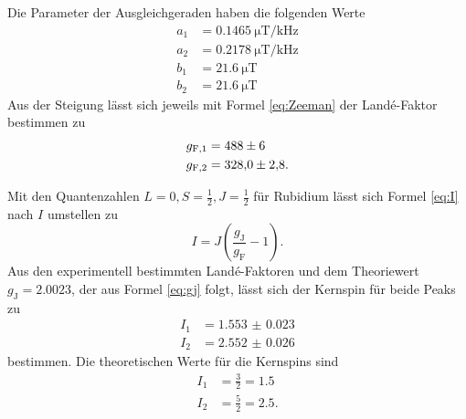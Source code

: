 Die Parameter der Ausgleichgeraden haben die folgenden Werte
\begin{align*}
    a_1 &= \SI{0.1465}{\micro\tesla\per\kilo\hertz} \\ %
    a_2 &= \SI{0.2178}{\micro\tesla\per\kilo\hertz} \\
    b_1 &= \SI{21.6}{\micro\tesla} \\
    b_2 &= \SI{21.6}{\micro\tesla}
\end{align*}
Aus der Steigung lässt sich jeweils mit Formel \ref{eq:Zeeman} der Landé-Faktor bestimmen zu
\begin{align*}
    g_{\text{F},1} &= \num{488 \pm 6} \\
    g_{\text{F},2} &= \num{328 \pm 2.8}.
\end{align*}

Mit den Quantenzahlen $L = 0, S = \frac{1}{2}, J = \frac{1}{2}$ für Rubidium lässt sich Formel \ref{eq:I} nach $I$ umstellen zu
\begin{equation*}
    I = J (\frac{g_\text{J}}{g_\text{F}} -1).
\end{equation*} 
Aus den experimentell bestimmten Landé-Faktoren und dem Theoriewert $g_\text{J} = \num{2.0023}$, der aus Formel \ref{eq:gj} folgt, lässt sich der Kernspin für beide Peaks zu
\begin{align*}
    I_1 &= \num{1.553(23)} \\
    I_2 &= \num{2.552(26)}
\end{align*}
bestimmen. 
Die theoretischen Werte für die Kernspins sind
\begin{align*}
    I_1 &= \frac{3}{2} = \num{1.5} \\
    I_2 &= \frac{5}{2} = \num{2.5}.
\end{align*}


